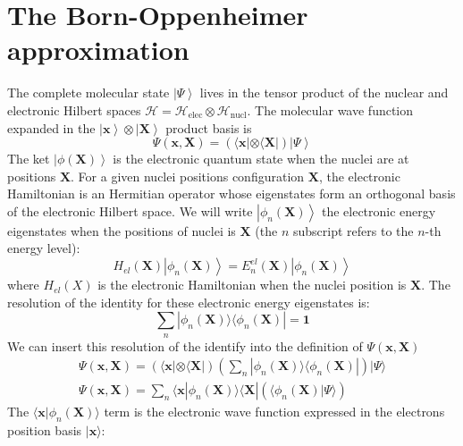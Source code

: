 \documentclass[11pt,a4paper]{article}
\begin{document}
\section{The Born-Oppenheimer approximation}
The complete molecular state $\left|\Psi\right\rangle$ lives in the tensor product of the nuclear and electronic Hilbert spaces $\mathcal{H} = \mathcal{H}_{\text{elec}} \otimes \mathcal{H}_{\text{nucl}}$. The molecular wave function expanded in the $\left|\mathbf{x}\right\rangle \otimes \left|\mathbf{X}\right\rangle$ product basis is
\begin{equation*}
	\Psi(\mathbf{x}, \mathbf{X}) = \left(\langle\mathbf{x}| \otimes \langle\mathbf{X}|\right) \left|\Psi\right\rangle
\end{equation*}
The ket $\left|\phi(\mathbf{X})\right\rangle$ is the electronic quantum state when the nuclei are at positions $\mathbf{X}$. For a given nuclei positions configuration $\mathbf{X}$, the electronic Hamiltonian is an Hermitian operator whose eigenstates form an orthogonal basis of the electronic Hilbert space. We will write $\left|\phi_n(\mathbf{X})\right\rangle$ the electronic energy eigenstates when the positions of nuclei is $\mathbf{X}$ (the $n$ subscript refers to the $n$-th energy level):
\begin{equation}
	\label{eq:Nuclear electronic eigenvalue equation}
	H_{el}(\mathbf{X}) \left|\phi_n(\mathbf{X})\right\rangle = E_n^{el}(\mathbf{X}) \left|\phi_n(\mathbf{X})\right\rangle
\end{equation}
where $H_{el}(X)$ is the electronic Hamiltonian when the nuclei position is $\mathbf{X}$. The resolution of the identity for these electronic energy eigenstates is:
\begin{equation*}
	\sum_n |\phi_n(\mathbf{X})\rangle \langle\phi_n(\mathbf{X})| = \mathbf{1}
\end{equation*}
We can insert this resolution of the identify into the definition of $\Psi(\mathbf{x},\mathbf{X})$
\begin{equation*}
	\begin{gathered}
		\Psi(\mathbf{x}, \mathbf{X}) = (\langle\mathbf{x}| \otimes \langle\mathbf{X}|) \left( \sum_n |\phi_n(\mathbf{X})\rangle \langle\phi_n(\mathbf{X})| \right) |\Psi\rangle \\[6pt]
		\Psi(\mathbf{x}, \mathbf{X}) = \sum_n \langle\mathbf{x} | \phi_n(\mathbf{X})\rangle \langle\mathbf{X}| (\langle\phi_n(\mathbf{X})|\Psi\rangle)
	\end{gathered}
\end{equation*}
The $\langle\mathbf{x} | \phi_n(\mathbf{X})\rangle$ term is the electronic wave function expressed in the electrons position basis $|\mathbf{x}\rangle$:
\end{document}
